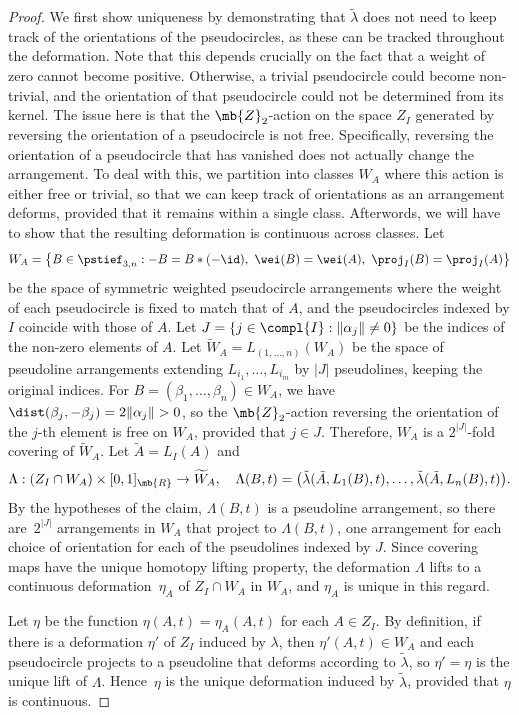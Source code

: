 \begin{proof}
We first show uniqueness by demonstrating that $\tilde \lambda$ does not need to keep track of the orientations of the pseudocircles, as these can be tracked throughout the deformation.
Note that this depends crucially on the fact that a weight of zero cannot become positive.
Otherwise, a trivial pseudocircle could become non-trivial, and the orientation of that pseudocircle could not be determined from its kernel. The issue here is that the $\mb{Z}_2$-action on the space $Z_I$ generated by reversing the orientation of a pseudocircle is not free. Specifically, reversing the orientation of a pseudocircle that has vanished does not actually change the arrangement. To deal with this, we partition into classes $W_A$ where this action is either free or trivial, so that we can keep track of orientations as an arrangement deforms, provided that it remains within a single class. Afterwords, we will have to show that the resulting deformation is continuous across classes.
Let
\[ W_A = \left\{B \in \pstief_{3,n}:-B = B*(-\id),\ \wei(B) = \wei(A),\ \proj_I(B) = \proj_I(A) \right\} \]
be the space of symmetric weighted pseudocircle arrangements where the weight of each pseudocircle is fixed to match that of $A$,
and the pseudocircles indexed by $I$ coincide with those of $A$.
Let ${J = \{j \in \compl{I}: \|\alpha_j\| \neq 0 \}}$ be the indices of the non-zero elements of $A$.
Let $\widetilde W_A = L_{(1,\dots,n)}(W_A)$
be the space of pseudoline arrangements extending $L_{i_1},\dots,L_{i_m}$ by $|J|$ pseudolines, keeping the original indices.
For $B = (\beta_1,\dots,\beta_n) \in W_A$, we have $\dist(\beta_j,- \beta_j) = 2\|\alpha_j\| >0$, so the $\mb{Z}_2$-action reversing the orientation of the $j$-th element is free on $W_A$, provided that $j \in J$.
Therefore, $W_A$ is a $2^{|J|}$-fold covering of $\widetilde W_A$.
Let $\tilde A = L_I(A)$ and
\[
\Lambda : (Z_I\cap W_A) \times [0,1]_\mb{R} \to \widetilde W_A, \quad
\Lambda(B,t) = \bigl( \tilde \lambda(\tilde A, L_1(B), t),\dots, \tilde \lambda(\tilde A, L_n(B),t) \bigr).
\]
By the hypotheses of the claim, $\Lambda(B,t)$ is a pseudoline arrangement, so there are~$2^{|J|}$ arrangements in $W_A$ that project to $\Lambda(B,t)$, one arrangement for each choice of orientation for each of the pseudolines indexed by $J$.
Since covering maps have the unique homotopy lifting property, the deformation $\Lambda$ lifts to a continuous deformation~$\eta_A$ of $Z_I \cap W_A$ in $W_A$, and $\eta_A$ is unique in this regard.

Let $\eta$ be the function $\eta(A,t) = \eta_A(A,t)$ for each $A \in Z_I$.
By definition, if there is a deformation $\eta'$ of $Z_I$ induced by $\lambda$, then $\eta'(A,t) \in W_A$ and each pseudocircle projects to a pseudoline that deforms according to $\tilde \lambda$, so $\eta' = \eta$ is the unique lift of $\Lambda$.
Hence~$\eta$ is the unique deformation induced by $\tilde \lambda$, provided that $\eta$ is continuous.


\end{proof}
